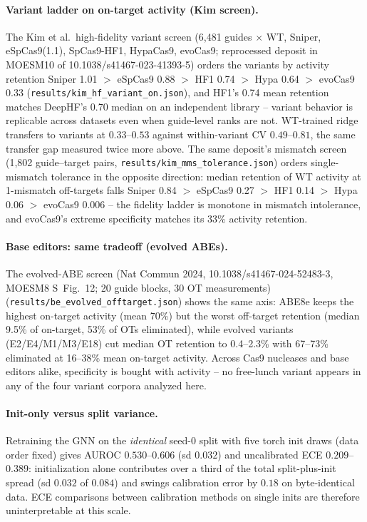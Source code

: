 \documentclass[12pt]{article}
\begin{document}
\paragraph{Variant ladder on on-target activity (Kim screen).} The Kim
et al.\ high-fidelity variant screen (6,481 guides $\times$ WT, Sniper,
eSpCas9(1.1), SpCas9-HF1, HypaCas9, evoCas9; reprocessed deposit in
MOESM10 of 10.1038/s41467-023-41393-5) orders the variants by activity
retention Sniper 1.01 $>$ eSpCas9 0.88 $>$ HF1 0.74 $>$ Hypa 0.64 $>$
evoCas9 0.33 (\texttt{results/kim\_hf\_variant\_on.json}), and HF1's
0.74 mean retention matches DeepHF's 0.70 median on an independent
library -- variant behavior is replicable across datasets even when
guide-level ranks are not. WT-trained ridge transfers to variants at
$0.33$--$0.53$ against within-variant CV $0.49$--$0.81$, the same
transfer gap measured twice more above. The same deposit's mismatch screen
(1,802 guide--target pairs, \texttt{results/kim\_mms\_tolerance.json})
orders single-mismatch tolerance in the opposite direction: median
retention of WT activity at 1-mismatch off-targets falls Sniper 0.84
$>$ eSpCas9 0.27 $>$ HF1 0.14 $>$ Hypa 0.06 $>$ evoCas9 0.006 -- the
fidelity ladder is monotone in mismatch intolerance, and evoCas9's
extreme specificity matches its 33\% activity retention.
\paragraph{Base editors: same tradeoff (evolved ABEs).} The evolved-ABE
screen (Nat Commun 2024, 10.1038/s41467-024-52483-3, MOESM8 S~Fig.~12;
20 guide blocks, 30 OT measurements)
(\texttt{results/be\_evolved\_offtarget.json}) shows the same axis:
ABE8e keeps the highest on-target activity (mean 70\%) but the worst
off-target retention (median 9.5\% of on-target, 53\% of OTs
eliminated), while evolved variants (E2/E4/M1/M3/E18) cut median OT
retention to 0.4--2.3\% with 67--73\% eliminated at 16--38\% mean
on-target activity. Across Cas9 nucleases and base editors alike,
specificity is bought with activity -- no free-lunch variant appears in
any of the four variant corpora analyzed here.

\paragraph{Init-only versus split variance.}
Retraining the GNN on the \emph{identical} seed-0 split with five torch
init draws (data order fixed) gives AUROC $0.530$--$0.606$ (sd $0.032$)
and uncalibrated ECE $0.209$--$0.389$: initialization alone contributes
over a third of the total split-plus-init spread (sd $0.032$ of $0.084$)
and swings calibration error by $0.18$ on byte-identical data. ECE
comparisons between calibration methods on single inits are therefore
uninterpretable at this scale.
\end{document}

